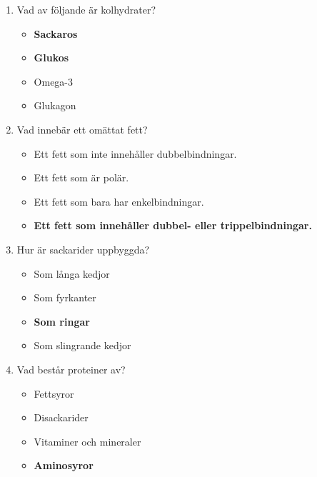 \documentclass{article}
\begin{document}
\begin{enumerate}[label=\arabic*.]
    \item Vad av följande är kolhydrater?
    \begin{itemize}
        \item \textbf{Sackaros} \\ 
        \item \textbf{Glukos} \\ 
        \item Omega-3
        \item Glukagon
    \end{itemize}

    \item Vad innebär ett omättat fett?
    \begin{itemize}
        \item Ett fett som inte innehåller dubbelbindningar.
        \item Ett fett som är polär.
        \item Ett fett som bara har enkelbindningar.
        \item \textbf{Ett fett som innehåller dubbel- eller trippelbindningar.} \\ 
    \end{itemize}

    \item Hur är sackarider uppbyggda?
    \begin{itemize}
        \item Som långa kedjor
        \item Som fyrkanter
        \item \textbf{Som ringar} \\ 
        \item Som slingrande kedjor
    \end{itemize}

    \item Vad består proteiner av?
    \begin{itemize}
        \item Fettsyror
        \item Disackarider
        \item Vitaminer och mineraler
        \item \textbf{Aminosyror} \\ 
    \end{itemize}
    \break


\end{enumerate}
\end{document}
